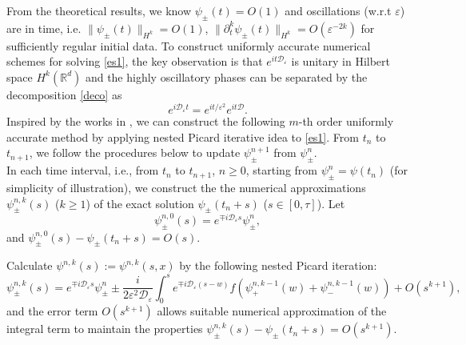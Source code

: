\documentclass[final,leqno,showlabe]{siamltex}
\begin{document}
From the theoretical results, we know $\psi_\pm(t)=O(1)$ and oscillations (w.r.t $\varepsilon$) are in time, i.e. $\|\psi_\pm(t)\|_{H^k}=O(1)$, $\|\partial_t^k\psi_\pm(t)\|_{H^k}=O(\varepsilon^{-2k})$ for sufficiently regular initial data. To construct uniformly accurate numerical schemes for solving \eqref{es1}, the key observation is that $e^{it\mathcal{D}_\varepsilon }$ is unitary in Hilbert space $H^k(\mathbb{R}^d)$ and the highly oscillatory phases can be separated by the decomposition   \eqref{deco} as
\begin{equation}\label{eq:deco}
e^{i\mathcal{D}_{\varepsilon}t}=e^{it/\varepsilon^2}e^{it\mathcal{D}}.
\end{equation}
Inspired by the works in \cite{Nested:2018,Lowre:2018,Asymptoticiterative:2018}, we can construct the following $m$-th order uniformly accurate method by applying nested Picard iterative idea to \eqref{es1}. From $t_n$ to $t_{n+1}$, we follow the procedures below to update $\psi_\pm^{n+1}$ from $\psi_{\pm}^n$. \\
 In each time interval, i.e., from $t_n$ to $t_{n+1}$, $n\geq 0$, starting from $ \psi_\pm^n= \psi(t_n)$ (for simplicity of illustration), we construct the the numerical approximations $\psi_\pm^{n,k}(s)$  ($k\ge1$) of the exact solution $\psi_\pm(t_n+s)$ ($s\in[0,\tau]$). Let
\begin{equation}\label{0npi}
\psi_\pm^{n,0}(s)=e^{\mp i\mathcal{D}_\varepsilon s}\psi_\pm^n,
\end{equation}
and $\psi_\pm^{n,0}(s)-\psi_\pm(t_n+s)=O(s)$.

 Calculate $\psi^{n,k}(s):=\psi^{n,k}(s,x)$ by the following nested Picard iteration:
\begin{equation}\label{es3}
\psi_\pm^{n,k}(s)=e^{\mp i\mathcal{D}_{\varepsilon} s}\psi_{\pm}^n\pm \frac{i}{2\varepsilon^2\mathcal{D}_{\varepsilon} }\int_0^s e^{\mp i \mathcal{D}_\varepsilon (s-w)} f(\psi_+^{n,k-1}(w)+\psi_-^{n,k-1}(w))+O(s^{k+1}),
\end{equation}
and the error term $O(s^{k+1})$   allows suitable numerical approximation of the integral term
to maintain the properties $\psi_\pm^{n,k}(s)-\psi_\pm(t_n+s)=O(s^{k+1})$.
\end{document}
